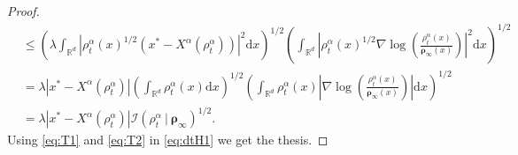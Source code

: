\documentclass[reqno]{amsart}
\numberwithin{algorithm}{section}
\newcommand{\diff}{\mathrm{d}}
\newcommand{\Xalpha}{{X^\alpha}}
\begin{document}
{\begin{proof}
\begin{equation}
\begin{aligned}
        &\leq\left(\lambda\int_{\mathbb{R}^d}|\rho^\alpha_t(x)^{1/2}(x^*-\Xalpha(\rho^\alpha_t)) |^2 \diff x\right)^{1/2}
        \left(\int_{\mathbb{R}^d}\left|\rho^\alpha_t(x)^{1/2}\nabla\log\left(\frac{\rho^\alpha_t(x)}{\boldsymbol\rho_\infty(x)}\right)\right|^2\diff x\right)^{1/2}\\
        &=\lambda |x^*-\Xalpha(\rho^\alpha_t) |\left(\int_{\mathbb{R}^d}\rho^\alpha_t(x) \diff x\right)^{1/2}\left(\int_{\mathbb{R}^d}\rho^\alpha_t(x)\left|\nabla\log\left(\frac{\rho^\alpha_t(x)}{\boldsymbol\rho_\infty(x)}\right)\right|\diff x\right)^{1/2}\\
        & = \lambda |x^*-\Xalpha(\rho^\alpha_t) | \mathcal I(\rho^\alpha_t\ |\ \boldsymbol\rho_\infty)^{1/2}.
    \end{aligned}
    \end{equation}
    Using \eqref{eq:T1} and \eqref{eq:T2} in \eqref{eq:dtH1} we get the thesis.
\end{proof}


}
\end{document}
